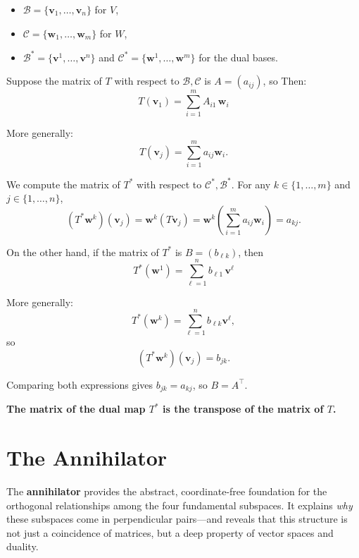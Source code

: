 \documentclass[11pt]{article}
\begin{document}
\begin{itemize}
\item $ \mathcal{B} = \{ \mathbf{v}_1, \dots, \mathbf{v}_n \} $ for $ V $,
    \item $ \mathcal{C} = \{ \mathbf{w}_1, \dots, \mathbf{w}_m \} $ for $ W $,
    \item $ \mathcal{B}^* = \{ \mathbf{v}^1, \dots, \mathbf{v}^n \} $ and $ \mathcal{C}^* = \{ \mathbf{w}^1, \dots, \mathbf{w}^m \} $ for the dual bases.
\end{itemize}


Suppose the matrix of $ T $ with respect to $ \mathcal{B}, \mathcal{C} $ is $ A = (a_{ij})$, so
Then:
\[
T(\mathbf{v}_1) = \sum_{i=1}^{m} A_{i1} \, \mathbf{w}_i
\]

More generally:
\[
T(\mathbf{v}_j) = \sum_{i=1}^m a_{ij} \mathbf{w}_i.
\]

We compute the matrix of $ T^* $ with respect to $ \mathcal{C}^*, \mathcal{B}^* $.  
For any $ k \in \{1, \dots, m\} $ and $ j \in \{1, \dots, n\} $,
\[
(T^* \mathbf{w}^k)(\mathbf{v}_j) = \mathbf{w}^k(T \mathbf{v}_j) = \mathbf{w}^k\left( \sum_{i=1}^m a_{ij} \mathbf{w}_i \right) = a_{kj}.
\]

On the other hand, if the matrix of $ T^* $ is $ B = (b_{\ell k}) $, then
\[
\boxed{T^*(\mathbf{w}^1) = \sum_{\ell=1}^{n} b_{\ell 1} \, \mathbf{v}^\ell}
\]


More generally:
\[
T^*(\mathbf{w}^k) = \sum_{\ell=1}^n b_{\ell k} \mathbf{v}^\ell,
\]
so
\[
(T^* \mathbf{w}^k)(\mathbf{v}_j) = b_{j k}.
\]

Comparing both expressions gives $ b_{j k} = a_{k j} $, so $ B = A^\top $.

\begin{center}
\textbf{The matrix of the dual map $ T^* $ is the transpose of the matrix of $ T $.}
\end{center}













\section*{The Annihilator}

The \textbf{annihilator} provides the abstract, coordinate-free foundation for the orthogonal relationships among the four fundamental subspaces. It explains \textit{why} these subspaces come in perpendicular pairs—and reveals that this structure is not just a coincidence of matrices, but a deep property of vector spaces and duality.
\end{document}
